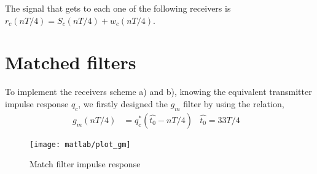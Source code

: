 \documentclass[a4paper,oneside]{article}
\begin{document}
The signal that gets to each one of the following receivers is
$r_c(nT/4) = S_c(nT/4) + w_c(nT/4)$.

\section{Matched filters}
To implement the receivers scheme a) and b), knowing the equivalent transmitter impulse response $q_c$, we firstly designed the $g_m$ filter by using the relation, 
\begin{align}
  g_m(n T/4) &= q_c^* (\hat{t_0}-n T/4) & \hat{t_0} = 33 T/4&
\end{align}

\begin{figure}[htbp]
  \centering
  \texttt{[image: matlab/plot\_gm]}
  \caption{Match filter impulse response}
  \label{plot:gm}
\end{figure}
\newpage
\end{document}
